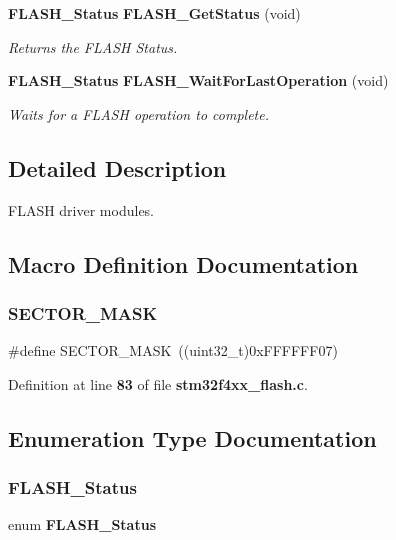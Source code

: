 \begin{DoxyCompactItemize}
\textbf{ F\+L\+A\+S\+H\+\_\+\+Status} \textbf{ F\+L\+A\+S\+H\+\_\+\+Get\+Status} (void)
\begin{DoxyCompactList}\small\item\em Returns the F\+L\+A\+SH Status. \end{DoxyCompactList}\item 
\textbf{ F\+L\+A\+S\+H\+\_\+\+Status} \textbf{ F\+L\+A\+S\+H\+\_\+\+Wait\+For\+Last\+Operation} (void)
\begin{DoxyCompactList}\small\item\em Waits for a F\+L\+A\+SH operation to complete. \end{DoxyCompactList}\end{DoxyCompactItemize}


\subsection{Detailed Description}
F\+L\+A\+SH driver modules. 



\subsection{Macro Definition Documentation}
\mbox{\label{group__FLASH_gaa2c907f663ac6d7fb5c311d08589b4f5}} 
\subsubsection{S\+E\+C\+T\+O\+R\+\_\+\+M\+A\+SK}
{\footnotesize\ttfamily \#define S\+E\+C\+T\+O\+R\+\_\+\+M\+A\+SK~((uint32\+\_\+t)0x\+F\+F\+F\+F\+F\+F07)}



Definition at line \textbf{ 83} of file \textbf{ stm32f4xx\+\_\+flash.\+c}.



\subsection{Enumeration Type Documentation}
\mbox{\label{group__FLASH_gadc63a6f3404ff1f71229a66915e9cdc0}} 
\subsubsection{F\+L\+A\+S\+H\+\_\+\+Status}
{\footnotesize\ttfamily enum \textbf{ F\+L\+A\+S\+H\+\_\+\+Status}}




